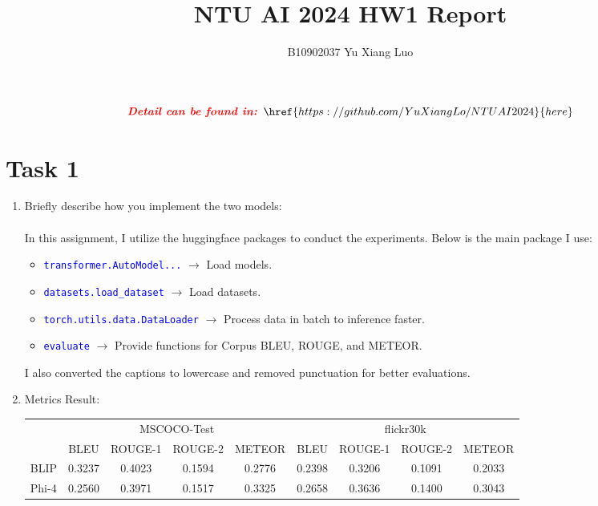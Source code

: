 \documentclass{article}
\title{NTU AI 2024 HW1 Report}
\author{B10902037 Yu Xiang Luo}
\date{}
\begin{document}
\maketitle

\[
	\textcolor{red}{\textbf{\textit{Detail can be found in: }}}
	\href{https://github.com/YuXiangLo/NTUAI2024}{here}
\]

\section*{Task 1}

\begin{enumerate}
    \item Briefly describe how you implement the two models: \\
		\\
		In this assignment, I utilize the huggingface packages to conduct the experiments. Below is the main package I use:
        \begin{itemize}
            \item \textcolor{blue}{\texttt{transformer.AutoModel...}} $\rightarrow$ Load models.
            \item \textcolor{blue}{\texttt{datasets.load\_dataset}} $\rightarrow$ Load datasets.
            \item \textcolor{blue}{\texttt{torch.utils.data.DataLoader}} $\rightarrow$ Process data in batch to inference faster.
			\item \textcolor{blue}{\texttt{evaluate}} $\rightarrow$ Provide functions for Corpus BLEU, ROUGE, and METEOR.
        \end{itemize}
		I also converted the captions to lowercase and removed punctuation for better evaluations.\\

    \item Metrics Result:
        \begin{table}[ht]
        \centering
        \begin{tabular}{l cccc cccc}
        \toprule
         & \multicolumn{4}{c}{MSCOCO-Test} & \multicolumn{4}{c}{flickr30k}\\
        \cmidrule(lr){2-5} \cmidrule(lr){6-9}
         & BLEU & ROUGE-1 & ROUGE-2 & METEOR & BLEU & ROUGE-1 & ROUGE-2 & METEOR \\
        \midrule
        BLIP  & 0.3237 & 0.4023 & 0.1594 & 0.2776 & 0.2398 & 0.3206 & 0.1091 & 0.2033 \\
        Phi-4 & 0.2560 & 0.3971 & 0.1517 & 0.3325 & 0.2658 & 0.3636 & 0.1400 & 0.3043 \\
        \bottomrule
        \end{tabular}
        \end{table}


\end{enumerate}
\end{document}
